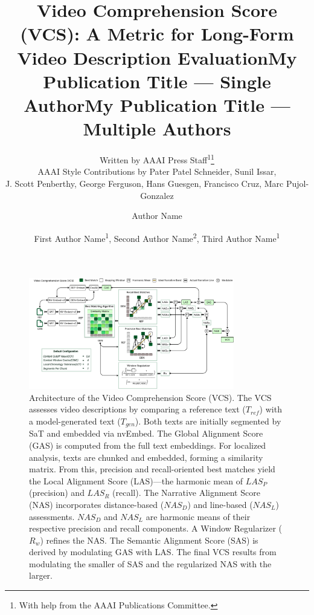 \documentclass[letterpaper]{article} %
\title{Video Comprehension Score (VCS): A Metric for Long-Form Video Description Evaluation}
\author{
    Written by AAAI Press Staff\textsuperscript{\rm 1}\thanks{With help from the AAAI Publications Committee.}\\
    AAAI Style Contributions by Pater Patel Schneider,
    Sunil Issar,\\
    J. Scott Penberthy,
    George Ferguson,
    Hans Guesgen,
    Francisco Cruz\equalcontrib,
    Marc Pujol-Gonzalez\equalcontrib
}
\title{My Publication Title --- Single Author}
\author {
    Author Name
}
\title{My Publication Title --- Multiple Authors}
\author {
    First Author Name\textsuperscript{\rm 1},
    Second Author Name\textsuperscript{\rm 2},
    Third Author Name\textsuperscript{\rm 1}
}
\begin{document}
\maketitle

\begin{figure}[t]
\centering
\includegraphics[width=0.8\textwidth]{VCS}
\caption{Architecture of the Video Comprehension Score (VCS). The VCS assesses video descriptions by comparing a reference text ($T_{ref}$) with a model-generated text ($T_{gen}$). Both texts are initially segmented by SaT and embedded via nvEmbed. The Global Alignment Score (GAS) is computed from the full text embeddings. For localized analysis, texts are chunked and embedded, forming a similarity matrix. From this, precision and recall-oriented best matches yield the Local Alignment Score (LAS)—the harmonic mean of $LAS_P$ (precision) and $LAS_R$ (recall). The Narrative Alignment Score (NAS) incorporates distance-based ($NAS_D$) and line-based ($NAS_L$) assessments. $NAS_D$ and $NAS_L$ are harmonic means of their respective precision and recall components. A Window Regularizer ($R_w$) refines the NAS. The Semantic Alignment Score (SAS) is derived by modulating GAS with LAS. The final VCS results from modulating the smaller of SAS and the regularized NAS with the larger.}
\label{fig:vcs-architecture}
\end{figure}
\end{document}
